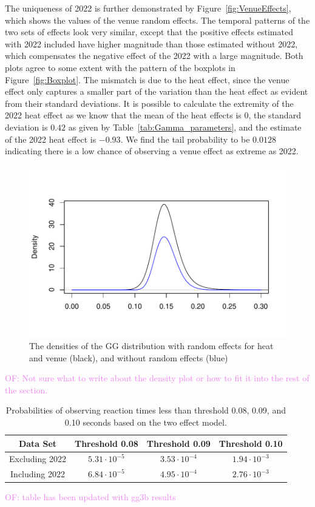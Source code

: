 \documentclass[12pt, letterpaper]{article}
\newcommand{\of}[1]{\textcolor{violet}{OF: #1}}
\begin{document}
The uniqueness of 2022 is further demonstrated by Figure~\ref{fig:VenueEffects},
which shows the values of the venue random effects.  The temporal patterns
of the two sets of effects look very similar, except that the positive effects
estimated with 2022 included have higher magnitude than those estimated without
2022, which compensates the negative effect of the 2022 with a large magnitude.
Both plots agree to some extent with the pattern of the boxplots in
Figure~\ref{fig:Boxplot}. The mismatch is due to the heat effect, since the venue
effect only captures a smaller part of the variation than the heat effect as
evident from their standard deviations. It is possible to calculate the extremity
of the 2022 heat effect as we know that the mean of the heat effects is $0$,
the standard deviation is $0.42$ as given by Table~\ref{tab:Gamma_parameters},
and the estimate of the 2022 heat effect is $-0.93$. We find the tail probability
to be $0.0128$ indicating there is a low chance of observing a venue effect as
extreme as 2022.


\begin{figure}[tbp]
  \centering
  \includegraphics{GGDensity}
  \caption{The densities of the GG distribution with random effects for heat
  and venue (black), and without random effects (blue)}
  \label{fig:DensityPlot}
\end{figure}
\of{Not sure what to write about the density plot or how to fit it into the rest
of the section.}

\begin{table}
  \centering
  \caption{Probabilities of observing reaction times less than threshold 0.08,
  0.09, and 0.10 seconds based on the two effect model.}
  \begin{tabular}{c c c c} 
   \toprule
   Data Set & Threshold 0.08 & Threshold 0.09 & Threshold 0.10  \\ 
   \midrule
   Excluding 2022 & $5.31\cdot10^{-5}$ & $3.53\cdot10^{-4}$ &  $1.94\cdot10^{-3}$  \\ 
   Including 2022 & $6.84\cdot10^{-5}$ & $4.95\cdot10^{-4}$ & $2.76\cdot10^{-3}$ \\
   \bottomrule
  \end{tabular}
  \label{tab:Sim_probability}
\end{table}
\of{table has been updated with gg3b results}
\end{document}
